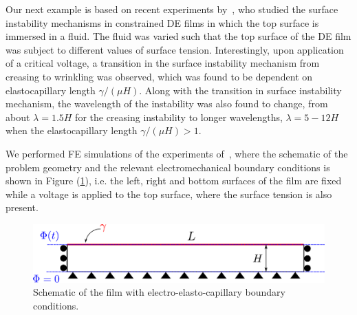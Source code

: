 \documentclass[final,authoryear,3p,times,twocolumn]{elsarticle}
\newcommand{\hsp}[1]{\textcolor{red}{[\textit{hsp}: #1]}}
\begin{document}
Our next example is based on recent experiments by~\citet{wangPRE2013}, who studied the surface instability mechanisms in constrained DE films in which the top surface is immersed in a fluid.  The fluid was varied such that the top surface of the DE film was subject to different values of surface tension.  Interestingly, upon application of a critical voltage, a transition in the surface instability mechanism from creasing to wrinkling was observed, which was found to be dependent on elastocapillary length $\gamma/(\mu H)$.  Along with the transition in surface instability mechanism, the wavelength of the instability was also found to change, from about $\lambda=1.5H$ for the creasing instability to longer wavelengths, $\lambda=5-12H$ when the elastocapillary length $\gamma/(\mu H)>1$.  

We performed FE simulations of the experiments of~\citet{wangPRE2013}, where the schematic of the problem geometry and the relevant electromechanical boundary conditions is shown in Figure (\ref{film}), i.e. the left, right and bottom surfaces of the film are fixed while a voltage is applied to the top surface, where the surface tension is also present.

\begin{figure} \begin{center} 
\includegraphics[scale=0.7]{pics/film.pdf}
\caption{Schematic of the film with electro-elasto-capillary boundary conditions.}
\label{film} \end{center} \end{figure}

\end{document}
